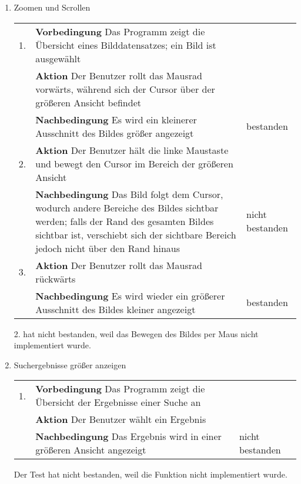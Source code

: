 \begin{enumerate} [label=\bfseries /TSW \arabic*0/, leftmargin=*]
	\item Zoomen und Scrollen \newline \newline
	\begin{tabular}{@{}rp{4in}|l}
	1. & \textbf{Vorbedingung} Das Programm zeigt die Übersicht eines Bilddatensatzes; ein Bild ist ausgewählt & \\
	   & \textbf{Aktion} Der Benutzer rollt das Mausrad vorwärts, während sich der Cursor über der größeren Ansicht befindet & \\
	   & \textbf{Nachbedingung} Es wird ein kleinerer Ausschnitt des Bildes größer angezeigt & bestanden \\
	\hline
	2. & \textbf{Aktion} Der Benutzer hält die linke Maustaste und bewegt den Cursor im Bereich der größeren Ansicht & \\
	   & \textbf{Nachbedingung} Das Bild folgt dem Cursor, wodurch andere Bereiche des Bildes sichtbar werden; falls der Rand des gesamten Bildes sichtbar ist, verschiebt sich der sichtbare Bereich jedoch nicht über den Rand hinaus & nicht bestanden \\
	\hline
	3. & \textbf{Aktion} Der Benutzer rollt das Mausrad rückwärts & \\
	   & \textbf{Nachbedingung} Es wird wieder ein größerer Ausschnitt des Bildes kleiner angezeigt & bestanden \\
	\end{tabular}
	\par
2. hat nicht bestanden, weil das Bewegen des Bildes per Maus nicht implementiert wurde.
	\newline

	\item Suchergebnisse größer anzeigen \newline \newline
	\begin{tabular}{@{}rp{4in}|l}
	1. & \textbf{Vorbedingung} Das Programm zeigt die Übersicht der Ergebnisse einer Suche an & \\
	   & \textbf{Aktion} Der Benutzer wählt ein Ergebnis & \\
	   & \textbf{Nachbedingung} Das Ergebnis wird in einer größeren Ansicht angezeigt & nicht bestanden \\
	\end{tabular}
	\par
Der Test hat nicht bestanden, weil die Funktion nicht implementiert wurde.
	\pagebreak


\end{enumerate}
